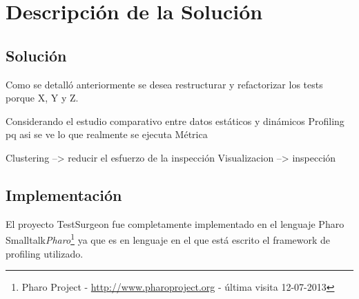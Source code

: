 \chapter{Descripción de la Solución}
\section{Solución}

\par Como se detalló anteriormente se desea restructurar y refactorizar los tests porque X, Y y Z.
\par Considerando el estudio comparativo entre datos estáticos y dinámicos 
Profiling pq asi se ve lo que realmente se ejecuta
Métrica

Clustering --> reducir el esfuerzo de la inspección
Visualizacion --> inspección


\section{Implementación}
\par El proyecto TestSurgeon fue completamente implementado en el lenguaje Pharo Smalltalk\emph{Pharo}\footnote{Pharo Project - \url{http://www.pharoproject.org} - última visita 12-07-2013 } ya que es en lenguaje en el que está escrito el framework de profiling utilizado. 

